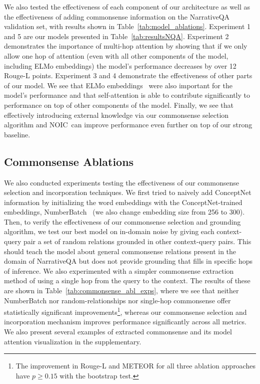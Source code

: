 \documentclass[11pt,a4paper]{article}
\def\tabref#1{Table~\ref{#1}}
\newcommand{\fullModel}{NOIC}
\begin{document}
We also tested the effectiveness of each component of our architecture as well as the effectiveness of adding commonsense information on the NarrativeQA validation set, with results shown in \tabref{tab:model_ablations}.
Experiment 1 and 5 are our models presented in \tabref{tab:resultsNQA}.
Experiment 2 demonstrates the importance of multi-hop attention by showing that if we only allow one hop of attention (even with all other components of the model, including ELMo embeddings) the model's performance decreases by over 12 Rouge-L points.
Experiment 3 and 4 demonstrate the effectiveness of other parts of our model. We
see that ELMo embeddings~\cite{peters2018deep} were also important for the
model's performance
and that self-attention is able to
contribute significantly to performance on top of other components of the model.
Finally, we see that effectively introducing external knowledge via our commonsense selection algorithm and \fullModel\ can improve performance even further on top of our strong baseline.


\subsection{Commonsense Ablations}

We also conducted experiments testing the effectiveness of our commonsense
selection and incorporation techniques.  We first tried to naively add
ConceptNet information by initializing the word embeddings with the
ConceptNet-trained embeddings, NumberBatch~\cite{speer2012representing} (we also
change embedding size from 256 to 300).  Then, to verify the effectiveness of
our commonsense selection and grounding algorithm, we test our best model on
in-domain noise by giving each context-query pair a set of random relations
grounded in other context-query pairs. This should teach the model about
general commonsense relations present in the domain of NarrativeQA but does not
provide grounding that fills in specific hops of inference. We also
experimented with a simpler commonsense extraction method of using a single hop
from the query to the context. The results of
these are shown in \tabref{tab:commonsense_abl_exps},
where we see that neither NumberBatch nor random-relationships nor single-hop commonsense offer
statistically significant improvements\footnote{The improvement in Rouge-L and METEOR for all three ablation approaches have
$p \geq 0.15$ with the bootstrap test.},
whereas our commonsense selection and incorporation mechanism improves performance significantly
across all metrics.
We also present several examples of extracted commonsense and its model attention visualization in the supplementary.
\end{document}
